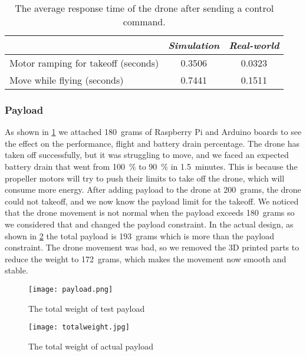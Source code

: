 \documentclass[../main.tex]{subfiles}
\begin{document}
\begin{table}[H]
	\centering
	\caption{The average response time of the drone after sending a control command.}
	\label{tab:respone-time}
	\begin{tabularx}{0.7\textwidth}{ X c c }
		\toprule
		\textit{} & \textit{Simulation} & \textit{Real-world}\\ \midrule
		Motor ramping for takeoff (seconds)  & 0.3506 & 0.0323     \\
		Move while flying (seconds) & 0.7441  & 0.1511   \\
		\bottomrule
	\end{tabularx}
\end{table} 

\subsubsection{Payload}

As shown in \cref{fig:payload}
we attached \SI{180}{grams} of Raspberry Pi and Arduino boards
to see the effect on the performance, flight and
battery drain percentage. 
The drone has taken off successfully, 
but it was struggling to move, and we faced an expected 
battery drain that went from 
\SI{100}{\percent} to \SI{90}{\percent} in 
\SI{1.5}{minutes}. This is because the propeller motors will try to push 
their limits to take off the drone, which will consume more energy.
After adding payload to the drone at \SI{200}{grams}, the drone could not
takeoff, and we now know the payload limit for the takeoff. 
We noticed that the drone movement
is not normal when the payload exceeds \SI{180}{grams} 
so we considered that and changed
the payload constraint. In the actual design, as shown in 
\cref{fig:actual-total-weight} the total payload 
is \SI{193}{grams} which is more than the payload constraint. 
The drone movement was bad, so we removed the 3D printed
parts to reduce the weight to \SI{172}{grams}, 
which makes the movement now smooth and stable.



\begin{figure}[H]
	\centering
	\texttt{[image: payload.png]}
	\caption{The total weight of test payload}
	\label{fig:payload}
\end{figure} 

\begin{figure}[H]
	\centering
	\texttt{[image: totalweight.jpg]}
	\caption{The total weight of actual payload}
	\label{fig:actual-total-weight}
\end{figure} 
\end{document}
